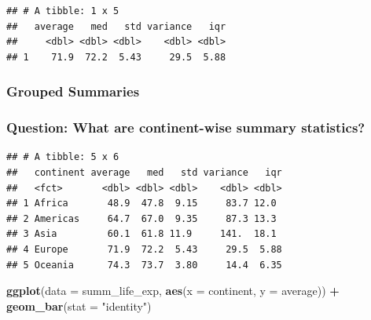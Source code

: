 \documentclass[12pt,]{article}
\newenvironment{Shaded}{\begin{snugshade}}{\end{snugshade}}
\newcommand{\KeywordTok}[1]{\textcolor[rgb]{0.13,0.29,0.53}{\textbf{#1}}}
\newcommand{\DataTypeTok}[1]{\textcolor[rgb]{0.13,0.29,0.53}{#1}}
\newcommand{\StringTok}[1]{\textcolor[rgb]{0.31,0.60,0.02}{#1}}
\newcommand{\OperatorTok}[1]{\textcolor[rgb]{0.81,0.36,0.00}{\textbf{#1}}}
\newcommand{\NormalTok}[1]{#1}
\begin{document}
\begin{verbatim}
## # A tibble: 1 x 5
##   average   med   std variance   iqr
##     <dbl> <dbl> <dbl>    <dbl> <dbl>
## 1    71.9  72.2  5.43     29.5  5.88
\end{verbatim}

\subsubsection{Grouped Summaries}\label{grouped-summaries}

\subsubsection{Question: What are continent-wise summary
statistics?}\label{question-what-are-continent-wise-summary-statistics}

\begin{Shaded}
\end{Shaded}

\begin{verbatim}
## # A tibble: 5 x 6
##   continent average   med   std variance   iqr
##   <fct>       <dbl> <dbl> <dbl>    <dbl> <dbl>
## 1 Africa       48.9  47.8  9.15     83.7 12.0 
## 2 Americas     64.7  67.0  9.35     87.3 13.3 
## 3 Asia         60.1  61.8 11.9     141.  18.1 
## 4 Europe       71.9  72.2  5.43     29.5  5.88
## 5 Oceania      74.3  73.7  3.80     14.4  6.35
\end{verbatim}

\begin{Shaded}
\begin{Highlighting}[]
\KeywordTok{ggplot}\NormalTok{(}\DataTypeTok{data =}\NormalTok{ summ_life_exp, }
       \KeywordTok{aes}\NormalTok{(}\DataTypeTok{x =}\NormalTok{ continent, }\DataTypeTok{y =}\NormalTok{ average)) }\OperatorTok{+}
\StringTok{  }\KeywordTok{geom_bar}\NormalTok{(}\DataTypeTok{stat =} \StringTok{"identity"}\NormalTok{)}
\end{Highlighting}
\end{Shaded}
\end{document}
